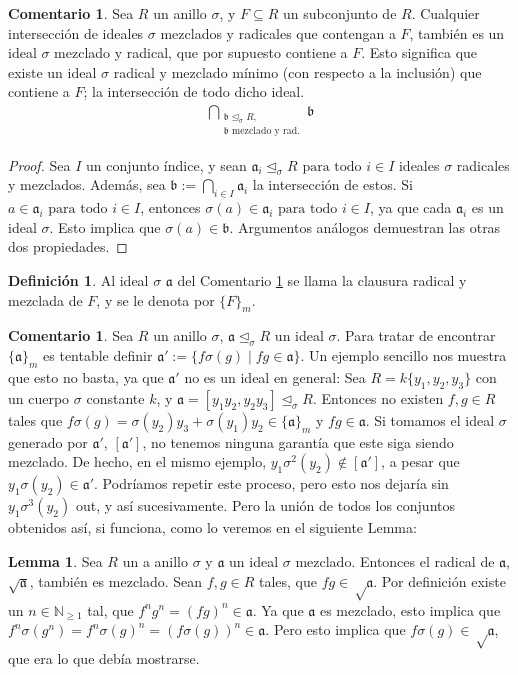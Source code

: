 \documentclass[12pt,a4paper,BCOR15mm,twoside,DIV12]{article}
\def\NE{\mathbb{N}_{\geq 1}}
\def\fa{\text{ para todo }}
\def\a{\mathfrak{a}}
\def\b{\mathfrak{b}}
\def\s{\sigma}
\def\si{\unlhd_{\sigma}}
\theoremstyle{definition}
\newtheorem{rem}[Satz]{Comentario}
\newtheorem{defn}[Satz]{Definición}
\newtheorem{lem}[Satz]{Lemma}
\begin{document}
\begin{rem}\label{wmwelldef}
Sea $R$ un anillo $\s$, y $F \subseteq R$ un subconjunto de $R$. Cualquier intersección de ideales $\s$ mezclados y radicales que contengan a $F$, también es un ideal $\s$ mezclado y radical, que por supuesto contiene a $F$. 
Esto significa que existe un ideal $\s$ radical y mezclado mínimo (con respecto a la inclusión) que contiene a $F$; la intersección de todo dicho ideal.
\begin{align*} \bigcap_{\substack{ \b \si R, \\ \b \text{ mezclado y rad.}}} \b \end{align*}
\begin{proof}
Sea $I$ un conjunto índice, y sean $\a_i \si R \fa i \in I$ ideales $\s$ radicales y mezclados. Además, sea $\b := \bigcap_{i \in I} \a_i$ la intersección de estos. Si $a \in \a_i \fa i \in I$, entonces $\s(a) \in \a_i \fa i \in I$, ya que cada $\a_i$ es un ideal $\s$.
Esto implica que $\s(a) \in \b$. Argumentos análogos demuestran las otras dos propiedades.
\end{proof}
\end{rem}

\begin{defn}
Al ideal $\s$ $\a$ del Comentario \ref{wmwelldef} se llama la clausura radical y mezclada de $F$, y se le denota por $\{F\}_{m}$.
\end{defn}

\begin{rem}\label{remshuffling}
Sea $R$ un anillo $\s$, $\a \si R$ un ideal $\s$. Para tratar de encontrar $\{\a\}_m$ es tentable definir $\a':= \{ f\s(g) \mid fg \in \a \}$. Un ejemplo sencillo nos muestra que esto no basta, ya que $\a'$ no es un ideal en general:
Sea $R=k\{y_1,y_2,y_3\}$ con un cuerpo $\s$ constante $k$, y $\a = [y_1y_2, y_2y_3] \si R$. Entonces no existen $f,g \in R$ tales que $ f \s(g) = \s(y_2)y_3 + \s(y_1)y_2 \in \{\a\}_m$ y $fg \in \a$. 
Si tomamos el ideal $\s$ generado por $\a'$, $[\a']$, no tenemos ninguna garantía que este siga siendo mezclado. De hecho, en el mismo ejemplo, $y_1\s^2(y_2) \notin [\a']$, a pesar que $y_1 \s(y_2) \in \a'$. 
Podríamos repetir este proceso, pero esto nos dejaría sin $y_1 \s^3(y_2)$ out, y así sucesivamente. Pero la unión de todos los conjuntos obtenidos así, si funciona, como lo veremos en el siguiente Lemma: 
\end{rem}

\begin{lem}\label{sqrtmixed}
Sea $R$ un a anillo $\s$ y $\a$ un ideal $\s$ mezclado. Entonces el radical de $\a$, $\sqrt{\a}$, también es mezclado.
Sean $f,g \in R$ tales, que $fg \in \sqrt \a$. Por definición existe un $n \in \NE$ tal, que $f^n g^n = (fg)^n \in \a$. Ya que $\a$ es mezclado, esto implica que $f^n \s(g^n) = f^n \s(g)^n = (f\s(g))^n \in \a$. 
Pero esto implica que $f\s(g) \in \sqrt \a$, que era lo que debía mostrarse.
\end{lem}
\end{document}
